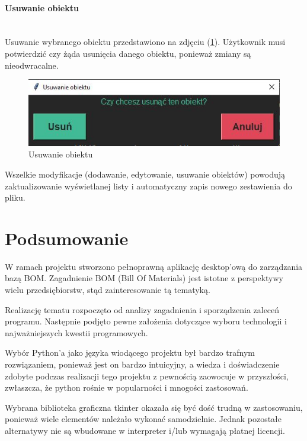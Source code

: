 \documentclass[12pt,twoside]{article}
\begin{document}
\paragraph*{Usuwanie obiektu}\mbox{}\\
Usuwanie wybranego obiektu przedstawiono na zdjęciu (\ref{fig:app:bom_remove_item}). Użytkownik musi potwierdzić czy żąda usunięcia danego obiektu, ponieważ zmiany są nieodwracalne.

\begin{figure}[H]
	\centering
	\includegraphics[width=\textwidth]{figures/app/bom_remove_item.jpg}
	\caption{Usuwanie obiektu}
\label{fig:app:bom_remove_item}
\end{figure}

Wszelkie modyfikacje (dodawanie, edytowanie, usuwanie obiektów) powodują zaktualizowanie wyświetlanej listy i automatyczny zapis nowego zestawienia do pliku.

\clearpage
\section{Podsumowanie}
W ramach projektu stworzono pełnoprawną aplikację desktop'ową do zarządzania bazą BOM. Zagadnienie BOM (Bill Of Materials) jest istotne z perspektywy wielu przedsiębiorstw, stąd zainteresowanie tą tematyką.

Realizację tematu rozpoczęto od analizy zagadnienia i sporządzenia zaleceń programu. Następnie podjęto pewne założenia dotyczące wyboru technologii i najważniejszych kwestii programowych. 

Wybór Python'a jako języka wiodącego projektu był bardzo trafnym rozwiązaniem, ponieważ jest on bardzo intuicyjny, a wiedza i doświadczenie zdobyte podczas realizacji tego projektu z pewnością zaowocuje w przyszłości, zwłaszcza, że python rośnie w popularności i mnogości zastosowań.

Wybrana biblioteka graficzna tkinter okazała się być dość trudną w zastosowaniu, ponieważ wiele elementów należało wykonać samodzielnie. Jednak pozostałe alternatywy nie są wbudowane w interpreter i/lub wymagają płatnej licencji.
\end{document}
